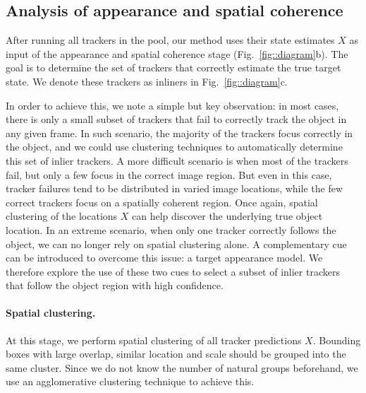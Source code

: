 \subsection{Analysis of appearance and spatial coherence}
After running all trackers in the pool, our method uses their state estimates
$X$ as input of the appearance and spatial coherence stage
(Fig.~\ref{fig::diagram}b). The goal is to determine the set of
trackers that correctly estimate the true target state. We denote these trackers
as inliners in Fig.~\ref{fig::diagram}c.

In order to achieve this, we note a simple but key observation: in most cases,
there is only a small subset of trackers that fail to correctly track the
object in any given frame.
In such scenario, the majority of the trackers focus correctly in the object,
and we could use clustering techniques to automatically determine this set
of inlier trackers.
A more difficult scenario is when most of the trackers fail, but only a few
focus in the correct image region. But even in this case, tracker failures
tend to be distributed in varied image locations, while the few correct
trackers focus on a spatially coherent region. Once again, spatial clustering
of the locations $X$ can help discover the underlying true object location.
In an extreme scenario, when only one tracker correctly follows the object,
we can no longer rely on spatial clustering alone.
A complementary cue can be introduced to overcome this issue: a target
appearance model. We therefore explore the use of these two cues
to select a subset of inlier trackers that follow the object region with
high confidence.


\paragraph{Spatial clustering.}
At this stage, we perform spatial clustering of all tracker predictions $X$.
Bounding boxes with large overlap, similar location and scale should be grouped
into the same cluster.
Since we do not know the number of natural groups beforehand, we use
an agglomerative clustering technique to achieve this.

